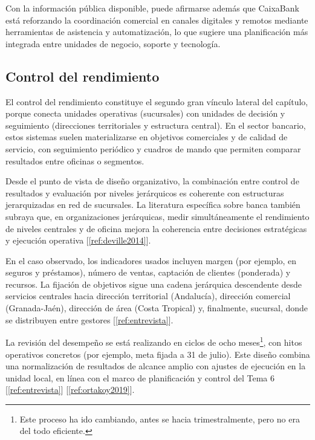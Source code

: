 Con la información pública disponible, puede afirmarse además que CaixaBank está
reforzando la coordinación comercial en canales digitales y remotos mediante
herramientas de asistencia y automatización, lo que sugiere una planificación más
integrada entre unidades de negocio, soporte y tecnología.

\subsection{Control del rendimiento}


El control del rendimiento constituye el segundo gran vínculo lateral del capítulo,
porque conecta unidades operativas (sucursales) con unidades de decisión y
seguimiento (direcciones territoriales y estructura central). En el sector bancario,
estos sistemas suelen materializarse en objetivos comerciales y de calidad de
servicio, con seguimiento periódico y cuadros de mando que permiten comparar
resultados entre oficinas o segmentos.

Desde el punto de vista de diseño organizativo, la combinación entre control de
resultados y evaluación por niveles jerárquicos es coherente con estructuras
jerarquizadas en red de sucursales. La literatura específica sobre banca también
subraya que, en organizaciones jerárquicas, medir simultáneamente el rendimiento
de niveles centrales y de oficina mejora la coherencia entre decisiones estratégicas
y ejecución operativa [\ref{ref:deville2014}].

En el caso observado, los indicadores usados incluyen margen (por ejemplo, en
seguros y préstamos), número de ventas, captación de clientes (ponderada) y
recursos. La fijación de objetivos sigue una cadena jerárquica descendente desde
servicios centrales hacia dirección territorial (Andalucía), dirección comercial
(Granada-Jaén), dirección de área (Costa Tropical) y, finalmente, sucursal, donde
se distribuyen entre gestores [\ref{ref:entrevista}].

La revisión del desempeño se está realizando en ciclos de ocho meses\footnote{Este proceso ha ido cambiando, antes se hacia trimestralmente, pero no era del todo eficiente.}, con hitos
operativos concretos (por ejemplo, meta fijada a 31 de julio). Este diseño combina
una normalización de resultados de alcance amplio con ajustes de ejecución en la
unidad local, en línea con el marco de planificación y control del Tema 6
[\ref{ref:entrevista}] [\ref{ref:ortakoy2019}].

